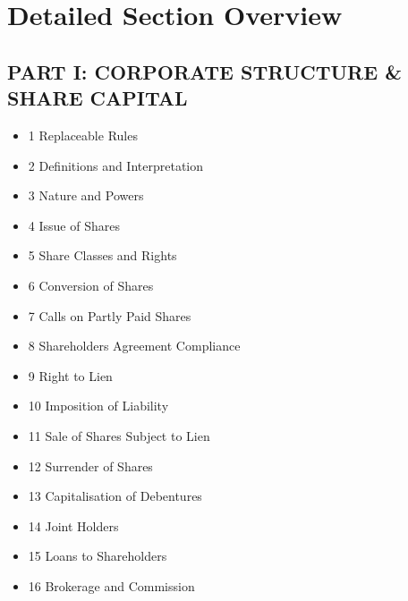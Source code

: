 \renewcommand{\contentsname}{Table of Contents}
\setcounter{tocdepth}{2}

\tableofcontents
\newpage

{}

\section*{Detailed Section Overview}

\renewcommand{\labelitemi}{}
\setlength{\leftmargini}{0pt}
\setlength{\itemsep}{2pt}

\subsection*{PART I: CORPORATE STRUCTURE \& SHARE CAPITAL}
\begin{itemize}[leftmargin=1em]
    \item 1 Replaceable Rules
    \item 2 Definitions and Interpretation
    \item 3 Nature and Powers
    \item 4 Issue of Shares
    \item 5 Share Classes and Rights
    \item 6 Conversion of Shares
    \item 7 Calls on Partly Paid Shares
    \item 8 Shareholders Agreement Compliance
    \item 9 Right to Lien
    \item 10 Imposition of Liability
    \item 11 Sale of Shares Subject to Lien
    \item 12 Surrender of Shares
    \item 13 Capitalisation of Debentures
    \item 14 Joint Holders
    \item 15 Loans to Shareholders
    \item 16 Brokerage and Commission
\end{itemize}

